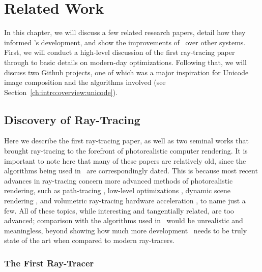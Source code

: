 %
%
\chapter{Related Work}
\label{ch:relatedwork}

In this chapter, we will discuss a few related research papers, detail how they informed \name's development, and show the improvements of \name\ over other systems.
First, we will conduct a high-level discussion of the first ray-tracing paper through to basic details on modern-day optimizations.
Following that, we will discuss two Github projects, one of which was a major inspiration for Unicode image composition and the algorithms involved (see Section~\ref{ch:intro:overview:unicode}).

\section{Discovery of Ray-Tracing}
\label{ch:relatedwork:discovery}

Here we describe the first ray-tracing paper, as well as two seminal works that brought ray-tracing to the forefront of photorealistic computer rendering.
It is important to note here that many of these papers are relatively old, since the algorithms being used in \name\ are correspondingly dated.
This is because most recent advances in ray-tracing concern more advanced methods of photorealistic rendering, such as path-tracing \cite{lafortune1993bi}, low-level optimizations \cite{wald2001interactive}, dynamic scene rendering \cite{wald2007ray}, and volumetric ray-tracing hardware acceleration \cite{kruger2003acceleration}, to name just a few.
All of these topics, while interesting and tangentially related, are too advanced; comparison with the algorithms used in \name\ would be unrealistic and meaningless, beyond showing how much more development \name\ needs to be truly state of the art when compared to modern ray-tracers.

\subsection{The First Ray-Tracer}
\label{ch:relatedwork:discovery:first}

